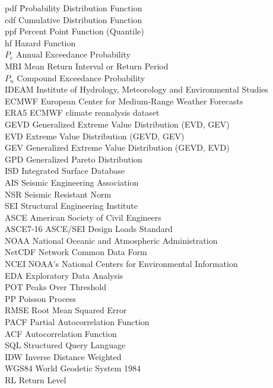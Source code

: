 \documentclass[12pt,oneside]{reedthesis}
\begin{document}
  \begin{dedication}
    \begin{tabbing}
    pdf \hspace{3em} \= Probability Distribution Function  \\
    cdf \>  Cumulative Distribution Function \\
    ppf \> Percent Point Function (Quantile) \\
    hf \> Hazard Function \\
    $P_e$ \> Annual Exceedance Probability \\
    MRI \> Mean Return Interval or Return Period \\
    $P_n$ \>  Compound Exceedance Probability \\
    IDEAM \> Institute of Hydrology, Meteorology and Environmental Studies \\
    ECMWF \>  European Center for Medium-Range Weather Forecasts \\
    ERA5 \>  ECMWF climate reanalysis dataset  \\
    GEVD \>  Generalized Extreme Value Distribution (EVD, GEV) \\
    EVD \>  Extreme Value Distribution (GEVD, GEV)  \\
    GEV \>  Generalized Extreme Value Distribution (GEVD, EVD)  \\
    GPD \>  Generalized Pareto Distribution  \\
    ISD \> Integrated Surface Database \\
    AIS \> Seismic Engineering Association  \\
    NSR \> Seismic Resistant Norm  \\
    SEI \> Structural Engineering Institute \\
    ASCE \> American Society of Civil Engineers \\
    ASCE7-16 \> ASCE/SEI Design Loads Standard \\
    NOAA \> National Oceanic and Atmospheric Administration \\
    NetCDF \> Network Common Data Form \\
    NCEI \> NOAA's National Centers for Environmental Information \\
    EDA \>  Exploratory Data Analysis \\
    POT \> Peaks Over Threshold \\
    PP \> Poisson Process \\
    RMSE \> Root Mean Squared Error \\
    PACF \> Partial Autocorrelation Function \\
    ACF \>  Autocorrelation Function \\
    SQL \>  Structured Query Language \\
    IDW \>  Inverse Distance Weighted \\
    WGS84 \> World Geodetic System 1984 \\
    RL \> Return Level
    \end{tabbing}
  \end{dedication}
\mainmatter %
\pagestyle{fancyplain} %
\end{document}
